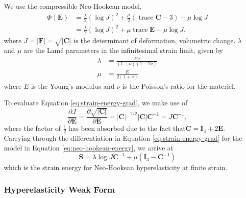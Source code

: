 We use the compressible Neo-Hookean model,
\begin{equation}
   \begin{aligned}
   \Phi \left( \mathbf E \right) &= \frac{\lambda}{2} \left( \log J \right)^2 + \frac \mu 2 \left(\operatorname{trace} \mathbf C - 3 \right) - \mu \log J \\
     &= \frac{\lambda}{2}\left( \log J \right)^2 + \mu \operatorname{trace} \mathbf E - \mu \log J,
   \end{aligned}
   \label{eq:neo-hookean-energy}
\end{equation}
where $J = \lvert \mathbf F \rvert = \sqrt{\lvert \mathbf C \rvert}$ is the determinant of deformation, volumetric change.
$\lambda$ and $\mu$ are the Lamé parameters in the infinitesimal strain limit, given by
\begin{equation}
\begin{split}
\lambda & = \frac{E \nu}{\left( 1 + \nu \right) \left( 1 - 2 \nu \right)} \\
\mu & = \frac{E}{2 \left( 1 + \nu \right)}
\end{split}
\end{equation}
where $E$ is the Young's modulus and $\nu$ is the Poisson's ratio for the materiel.

To evaluate Equation \ref{eq:strain-energy-grad}, we make use of
\begin{equation}
   \frac{\partial J}{\partial \mathbf E} = \frac{\partial \sqrt{\lvert \mathbf C \rvert}}{\partial \mathbf E} = \lvert \mathbf C \rvert^{-1/2} \lvert \mathbf C \rvert \mathbf C^{-1} = J \mathbf C^{-1},
\end{equation}
where the factor of $\frac 1 2$ has been absorbed due to the fact that$\mathbf C = \mathbf I_3 + 2 \mathbf E$.
Carrying through the differentiation in Equation \ref{eq:strain-energy-grad} for the model in Equation \ref{eq:neo-hookean-energy}, we arrive at
\begin{equation}
   \mathbf S = \lambda \log J \mathbf C^{-1} + \mu (\mathbf I_3 - \mathbf C^{-1})
   \label{eq:neo-hookean-stress}
\end{equation}
which is the strain energy for Neo-Hookean hyperelasticity at finite strain.

\subsubsection{Hyperelasticity Weak Form}


